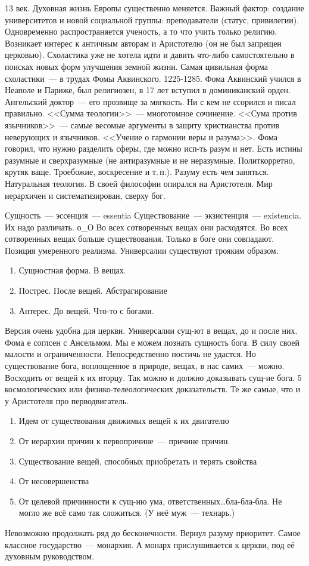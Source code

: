 13 век. Духовная жизнь Европы существенно меняется. Важный фактор: создание университетов и новой социальной группы: преподаватели (статус, привилегии). Одновременно распространяется ученость, а то что учить только религию. Возникает интерес к античным авторам и Аристотелю (он не был запрещен церковью). Схоластика уже не хотела идти и давить что-либо самостоятельно в поисках новых форм улучшения земной жизни. Самая цивильная форма схоластики~--- в трудах Фомы Аквинского. 1225-1285. Фома Аквинский учился в Неаполе и Париже, был религиозен, в 17 лет вступил в доминиканский орден. Ангельский доктор~--- его прозвище за мягкость. Ни с кем не ссорился и писал правильно. <<Сумма теологии>>~--- многотомное сочинение. <<Сума против язычников>>~--- самые весомые аргументы в защиту христианства против неверующих и язычников. <<Учение о гармонии веры и разума>>. Фома говорил, что нужно разделить сферы, где можно исп-ть разум и нет. Есть истины разумные и сверхразумные (не антиразумные и не неразумные. Политкорретно, крутяк ваще. Троебожие, воскресение и т.\,п.). Разуму есть чем заняться. Натуральная теология. В своей философии опирался на Аристотеля. Мир иерархичен и систематизирован, сверху бог.

Сущность~--- эссенция~--- essentia
Существование~--- экзистенция~--- existencia. Их надо различать. о\_О
Во всех сотворенных вещах они расходятся. Во всех сотворенных вещах больше существования. Только в боге они совпадают. Позиция умеренного реализма. Универсалии существуют трояким образом.

\begin{enumerate}
	\item Сущностная форма. В вещах.
	\item Пострес. После вещей. Абстрагирование
	\item Антерес. До вещей. Что-то с богами.
\end{enumerate}Версия очень удобна для церкви. Универсалии сущ-ют в вещах, до и после них.
Фома е соглсен с Ансельмом. Мы е можем познать сущность бога. В силу своей малости и ограниченности. Непосредственно постичь не удастся. Но существование бога, воплощенное в природе, вещах, в нас самих~--- можно. Восходить от вещей к их вторцу. Так можно и должно доказывать сущ-ие бога. 5 космологических или физико-телеологических доказательств. Те же самые, что и у Аристотеля про перводвигатель.

\begin{enumerate}
	\item Идем от существования движимых вещей к их двигателю
	\item От иерархии причин к первопричине~--- причине причин.
	\item Существование вещей, способных приобретать и терять свойства
	\item От несовершенства
	\item От целевой причинности к сущ-ию ума, ответственных\ldots бла-бла-бла. Не могло же всё само так сложиться. (У неё муж~--- технарь.) 
\end{enumerate}
Невозможно продолжать ряд до бесконечности.
Вернул разуму приоритет.
Самое классное государство~--- монархия. А монарх прислушивается к церкви, под её духовным руководством.



